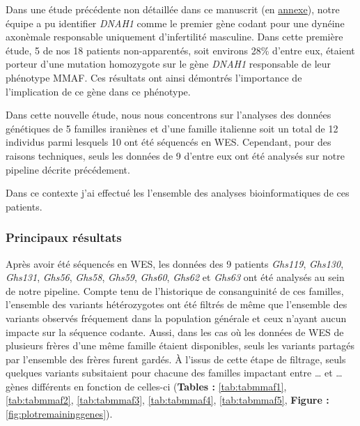 \documentclass[12pt,twoside]{reedthesis}
\theoremstyle{definition}
\theoremstyle{definition}
\theoremstyle{remark}
\begin{document}
  Dans une étude précédente non détaillée dans ce manuscrit (en
  \protect\hyperlink{dnah12014}{annexe}), notre équipe a pu identifier
  \emph{DNAH1} comme le premier gène codant pour une dynéine axonèmale
  responsable uniquement d'infertilité masculine. Dans cette première
  étude, 5 de nos 18 patients non-apparentés, soit environs 28\% d'entre
  eux, étaient porteur d'une mutation homozygote sur le gène \emph{DNAH1}
  responsable de leur phénotype MMAF. Ces résultats ont ainsi démontrés
  l'importance de l'implication de ce gène dans ce phénotype.
  
  Dans cette nouvelle étude, nous nous concentrons sur l'analyses des
  données génétiques de 5 familles iraniènes et d'une famille italienne
  soit un total de 12 individus parmi lesquels 10 ont été séquencés en
  WES. Cependant, pour des raisons techniques, seuls les données de 9
  d'entre eux ont été analysés sur notre pipeline décrite précédement.
  
  Dans ce contexte j'ai effectué les l'ensemble des analyses
  bioinformatiques de ces patients.
  
  \newpage
  
  
  
  \newpage
  
  \subsubsection{Principaux résultats}\label{principaux-resultats-2}
  
  Après avoir été séquencés en WES, les données des 9 patients
  \emph{Ghs119}, \emph{Ghs130}, \emph{Ghs131}, \emph{Ghs56}, \emph{Ghs58},
  \emph{Ghs59}, \emph{Ghs60}, \emph{Ghs62} et \emph{Ghs63} ont été
  analysés au sein de notre pipeline. Compte tenu de l'historique de
  consanguinité de ces familles, l'ensemble des variants hétérozygotes ont
  été filtrés de même que l'ensemble des variants observés fréquement dans
  la population générale et ceux n'ayant aucun impacte sur la séquence
  codante. Aussi, dans les cas où les données de WES de plusieurs frères
  d'une même famille étaient disponibles, seuls les variants partagés par
  l'ensemble des frères furent gardés. À l'issus de cette étape de
  filtrage, seuls quelques variants subsitaient pour chacune des familles
  impactant entre \ldots{} et \ldots{} gènes différents en fonction de
  celles-ci (\textbf{Tables :} \ref{tab:tabmmaf1}, \ref{tab:tabmmaf2},
  \ref{tab:tabmmaf3}, \ref{tab:tabmmaf4}, \ref{tab:tabmmaf5},
  \textbf{Figure : }\ref{fig:plotremaininggenes}).
  
\end{document}
